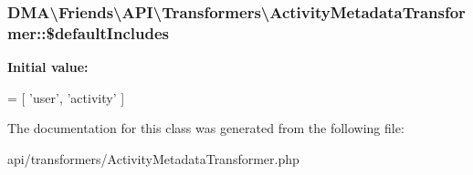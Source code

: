 \subsubsection[{\$default\+Includes}]{\setlength{\rightskip}{0pt plus 5cm}D\+M\+A\textbackslash{}\+Friends\textbackslash{}\+A\+P\+I\textbackslash{}\+Transformers\textbackslash{}\+Activity\+Metadata\+Transformer\+::\$default\+Includes\hspace{0.3cm}{\ttfamily [protected]}}\label{classDMA_1_1Friends_1_1API_1_1Transformers_1_1ActivityMetadataTransformer_ad9605adbc0b9d413715acf40ab083715}
{\bfseries Initial value\+:}
\begin{DoxyCode}
= [
            \textcolor{stringliteral}{'user'},
            \textcolor{stringliteral}{'activity'}
    ]
\end{DoxyCode}


The documentation for this class was generated from the following file\+:\begin{DoxyCompactItemize}
\item 
api/transformers/Activity\+Metadata\+Transformer.\+php\end{DoxyCompactItemize}
